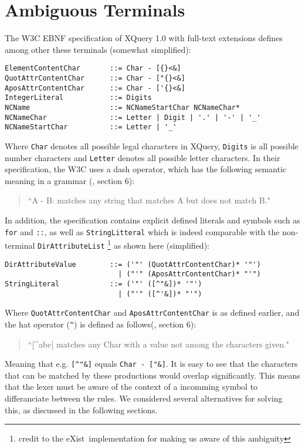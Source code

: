 \section{Ambiguous Terminals}
\label{sect:ambiguousgrammar:ambigTerm}
The W3C EBNF specification of XQuery 1.0 with full-text extensions\cite{w3c01} defines among other these terminals (somewhat simplified):
\begin{Verbatim}
ElementContentChar       ::= Char - [{}<&]
QuotAttrContentChar      ::= Char - ["{}<&]
AposAttrContentChar      ::= Char - ['{}<&]
IntegerLiteral           ::= Digits
NCName                   ::= NCNameStartChar NCNameChar*
NCNameChar               ::= Letter | Digit | '.' | '-' | '_'
NCNameStartChar          ::= Letter | '_'
\end{Verbatim}
Where \verb!Char! denotes all possible legal characters in XQuery, \verb!Digits! is all possible number characters and \verb!Letter! denotes all possible letter characters. In their specification, the W3C uses a dash operator, which has the following
semantic meaning in a grammar (\cite{w3c03}, section 6):
\begin{quote}
``A - B: matches any string that matches A but does not match B."
\end{quote}
In addition, the specification contains explicit defined literals and symbols such as \verb!for! and \verb!::!, as well as \verb!StringLitteral! which is indeed comparable with the non-terminal \verb!DirAttributeList! \footnote{credit to the eXist\cite{exist_doc}~implementation for making us aware of this ambiguity} as shown here (simplified):
\begin{Verbatim}
DirAttributeValue        ::= ('"' (QuotAttrContentChar)* '"')
                           | ("'" (AposAttrContentChar)* "'")
StringLiteral            ::= ('"' ([^"&])* '"') 
                           | ("'" ([^'&])* "'")
\end{Verbatim}
Where \verb!QuotAttrContentChar! and \verb!AposAttrContentChar! is as defined earlier, and the hat operator (\verb!^!) is defined as follows(\cite{w3c03}, section 6):
\begin{quote}
``[\^{}abc] matches any Char with a value not among the characters given."
\end{quote}
Meaning that e.g. \verb![^"&]! equals \verb!Char - ["&]!. It is easy to see that the characters that can be matched by these productions would overlap significantly. This means that the lexer must be aware of the context of a incomming symbol to differanciate between the rules. We considered several alternatives for solving this, as discussed in the following sections.

